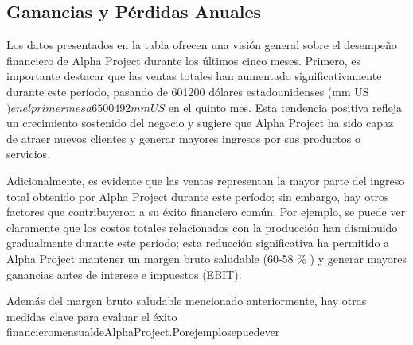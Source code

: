 

\subsection{Ganancias y Pérdidas Anuales}\label{sec:title}

Los datos presentados en la tabla ofrecen una visión general sobre el desempeño financiero de Alpha Project durante los últimos cinco meses. Primero, es importante destacar que las ventas totales han aumentado significativamente durante este período, pasando de 601200 dólares estadounidenses (mm US$) en el primer mes a 6500492 mm US$ en el quinto mes. Esta tendencia positiva refleja un crecimiento sostenido del negocio y sugiere que Alpha Project ha sido capaz de atraer nuevos clientes y generar mayores ingresos por sus productos o servicios. 

Adicionalmente, es evidente que las ventas representan la mayor parte del ingreso total obtenido por Alpha Project durante este período; sin embargo, hay otros factores que contribuyeron a su éxito financiero común. Por ejemplo, se puede ver claramente que los costos totales relacionados con la producción han disminuido gradualmente durante este período; esta reducción significativa ha permitido a Alpha Project mantener un margen bruto saludable (60-58 \% ) y generar mayores ganancias antes de interese e impuestos (EBIT). 

Además del margen bruto saludable mencionado anteriormente, hay otras medidas clave para evaluar el éxito financieromensualdeAlphaProject.Porejemplosepuedever